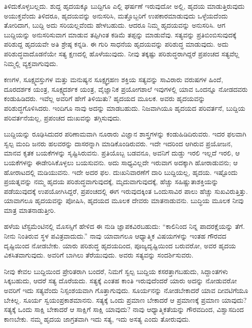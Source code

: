 ತಿಳಿದುಕೊಳ್ಳಬಲ್ಲದು. ಶುದ್ದ ಹೃದಯಕ್ಕೂ ಬುದ್ದಿಗೂ ಎಲ್ಲಿ ಘರ್ಷಣೆ ಇರುವುದೋ ಅಲ್ಲಿ, ಹೃದಯ ಮಾಡುತ್ತಿರುವುದು ಅಯುಕ್ತವೆಂದು ತಿಳಿದರೂ, ಹೃದಯವನ್ನು ಅನುಸರಿಸಿ, ಮತ್ತೊಬ್ಬರಿಗೆ ಉಪಕಾರಮಾಡುವುದು ಒಳ್ಳೆಯದೆಂದು ತೋರಿದಾಗ, ಬುದ್ದಿ ಅದು ಸರಿಯಲ್ಲವೆಂದು ಹೇಳಬಹುದು. ಆದರೂ ನಿಮ್ಮ ಹೃದಯವನ್ನು ಅನುಸರಿಸಿ. ಆಗ ಬುದ್ದಿಯನ್ನು ಅನುಸರಿಸುವಾಗ ಮಾಡುವ ತಪ್ಪಿಗಿಂತ ಕಡಿಮೆ ತಪ್ಪನ್ನು ಮಾಡುವೆವು. ಸತ್ಯವನ್ನು ಪ್ರತಿಬಿಂಬಿಸುವುದಕ್ಕೆ ಪರಿಶುದ್ದ ಹೃದಯವೇ ಅತಿ ಶ್ರೇಷ್ಠ ಕನ್ನಡಿ. ಈ ಗುರಿ ಸಾಧನೆಯ ಹೃದಯವನ್ನು ಪರಿಶುದ್ಧ ಮಾಡುವುದು. ಅದು ಪರಿಶುದ್ಧವಾದೊಡನೆಯೇ ಸತ್ಯ ಕ್ಷಣದಲ್ಲಿ ಹೊಳೆಯುವುದು. ನೀವು ತಕ್ಕಷ್ಟು ಪರಿಶುದ್ಧರಾಗಿದ್ದರೆ ಪ್ರಪಂಚದ ಸತ್ಯವೆಲ್ಲ ನಿಮ್ಮಲ್ಲಿ ವ್ಯಕ್ತವಾಗುವುದು.

ಕಣಗಳ, ಸೂಕ್ಷ್ಮವಸ್ತುಗಳ ಮತ್ತು ಮನುಷ್ಯನ ಸೂಕ್ಷ್ಮಗ್ರಹಣ ಶಕ್ತಿಯ ಸತ್ಯವನ್ನು ಸಾವಿರಾರು ವರುಷಗಳ ಹಿಂದೆ, ದೂರದರ್ಶಕ ಯಂತ್ರ, ಸೂಕ್ಷ್ಮದರ್ಶಕ ಯಂತ್ರ, ವೈಜ್ಞಾನಿಕ ಪ್ರಯೋಗಶಾಲೆ ಇವುಗಳಲ್ಲಿ ಯಾವ ಒಂದನ್ನೂ ನೋಡದವರು ಕಂಡುಹಿಡಿದರು. ಇವೆಲ್ಲ ಅವರಿಗೆ ಹೇಗೆ ತಿಳಿಯಿತು? ಹೃದಯದ ಮೂಲಕ. ಅವರು ಹೃದಯವನ್ನು ಪರಿಶುದ್ಧಗೊಳಿಸಿದರು. ಇಂದಿಗೂ ನಾವು ಅದನ್ನು ಮಾಡಬಹುದು. ನಿಜವಾಗಿಯೂ ಹೃದಯದ ಪರಿವರ್ತನೆ, ಬುದ್ದಿಯ ಪರಿವರ್ತನೆಯಲ್ಲ, ಪ್ರಪಂಚದ ದುಃಖವನ್ನು ತಗ್ಗಿಸುವುದು.

ಬುದ್ದಿಯನ್ನು ರೂಢಿಸಿದುದರ ಪರಿಣಾಮವಾಗಿ ನೂರಾರು ವಿಜ್ಞಾನ ಶಾಸ್ತ್ರಗಳನ್ನು ಕಂಡುಹಿಡಿದಿರುವರು. ಇದರ ಫಲವಾಗಿ ಸ್ವಲ್ಪ ಮಂದಿ ಜನರು ಹಲವರನ್ನು ದಾಸರನ್ನಾಗಿ ಮಾಡಿಕೊಂಡಿರುವರು. ಇದೇ ಇದರಿಂದ ಆಗಿರುವ ಪ್ರಯೋಜನ, ಮಾನವ ಕೃತಕ ಬಯಕೆಗಳನ್ನು ಸೃಷ್ಟಿಸಿರುವನು. ಪ್ರತಿಯೊಬ್ಬ ಬಡವನೂ, ಅವನಿಗೆ ದುಡ್ಡು ಇರಲಿ ಇಲ್ಲದೆ ಇರಲಿ, ಆ ಬಯಕೆಗಳನ್ನು ಈಡೇರಿಸಿಕೊಳ್ಳಲು ಬಯಸುವನು. ಅದು ಸಾಧ್ಯವಿಲ್ಲದೇ ಇರುವಾಗ ಅದಕ್ಕಾಗಿ ಹೋರಾಡುವನು; ಆ ಹೋರಾಟದಲ್ಲಿ ಮಡಿಯುವನು. ಇದೇ ಅದರ ಫಲ. ದುಃಖನಿವಾರಣೆಗೆ ದಾರಿ ಬುದ್ದಿಯಲ್ಲ, ಹೃದಯ. ಇಷ್ಟೊಂದು ಪ್ರಯತ್ನವನ್ನು ನಮ್ಮ ಹೃದಯ ಪರಿಶುದ್ಧವಾಗುವುದಕ್ಕೆ, ಮೃದುವಾಗುವುದಕ್ಕೆ, ಹೆಚ್ಚು ಸಹಿಷ್ಣುತಾಶಕ್ತಿಯನ್ನು ಪಡೆಯುವುದಕ್ಕೆ ಉಪಯೋಗಿಸಿದ್ದರೆ, ಪ್ರಪಂಚದಲ್ಲಿ ಈಗ ಇರುವುದಕ್ಕಿಂತ ಒಂದುಸಾವಿರ ಪಾಲು ಹೆಚ್ಚು ಸುಖವಿರುತ್ತಿತ್ತು. ಯಾವಾಗಲೂ ಹೃದಯವನ್ನು ಪೋಷಿಸಿ, ಹೃದಯದ ಮೂಲಕ ದೇವರು ಮಾತನಾಡುವನು. ಬುದ್ಧಿಯ ಮೂಲಕ ನೀವು ಮಾತ್ರ ಮಾತನಾಡುತ್ತೀರಿ.

ಹಳೆಯ ಟೆಸ್ಟಮೆಂಟಿನಲ್ಲಿ ಮೊಸಸ್ಸಿಗೆ ಹೇಳಿದ ಈ ನುಡಿ ಜ್ಞಾಪಕವಿರಬಹುದು: “ಕಾಲಿನಿಂದ ನಿನ್ನ ಪಾದರಕ್ಷೆಯನ್ನು ತೆಗೆ. ನೀನು ನಿಂತಿರುವ ಸ್ಥಳ ಪವಿತ್ರವಾದುದು.'' ನಾವು ಯಾವಾಗಲೂ ಆಧ್ಯಾತ್ಮಿಕ ವಿಷಯಗಳನ್ನು ಇಂತಹ ಗೌರವದ ದೃಷ್ಟಿಯಿಂದ ನೋಡಬೇಕು. ಯಾರು ಪರಿಶುದ್ಧ ಹೃದಯದಿಂದ, ಪೂಜ್ಯದೃಷ್ಟಿಯಿಂದ ಬರುವರೋ, ಅವರ ಹೃದಯ ವಿಕಸಿತವಾಗುವುದು. ಅವರಿಗೆ ಬಾಗಿಲು ತೆರೆಯುವುದು. ಅವರು ಸತ್ಯವನ್ನು ಸಂದರ್ಶಿಸುವರು.

ನೀವು ಕೇವಲ ಬುದ್ದಿಯಿಂದ ಪ್ರೇರಿತರಾಗಿ ಬಂದರೆ, ನಿಮಗೆ ಸ್ವಲ್ಪ ಬುದ್ದಿಯ ಕಸರತ್ತಾಗಬಹುದು, ಸಿದ್ದಾಂತಗಳು ಸಿಕ್ಕಬಹುದು, ಆದರೆ ಸತ್ಯ ದೊರೆಯದು. ಸತ್ಯಕ್ಕೆ ಎಂತಹ ಕಾಂತಿ ಇರುವುದೆಂದರೆ ಯಾರು ಅದನ್ನು ನೋಡುವರೋ ಅವರಿಗೆ ಇದು ಸತ್ಯವೆಂದು ನಿಸ್ಸಂಶಯವಾಗಿ ಗೊತ್ತಾಗುವುದು. ಸೂರ್ಯನನ್ನು ನೋಡಬೇಕಾದರೆ ಯಾವ ದೀವಟಿಗೆಯೂ ಬೇಕಿಲ್ಲ. ಸೂರ್ಯ ಸ್ವಯಂಪ್ರಕಾಶಮಾನನು. ಸತ್ಯಕ್ಕೆ ಒಂದು ಪ್ರಮಾಣ ಬೇಕಾದರೆ ಆ ಪ್ರಮಾಣಕ್ಕೆ ಪ್ರಮಾಣ ಯಾವುದು? ಸತ್ಯಕ್ಕೆ ಒಂದು ಸಾಕ್ಷಿ ಬೇಕಾದರೆ ಆ ಸಾಕ್ಷಿಗೆ ಸಾಕ್ಷಿ ಯಾವುದು? ನಾವು ಆಧ್ಯಾತ್ಮಿಕತೆಯನ್ನು ಗೌರವದಿಂದ, ವಿಶ್ವಾಸದಿಂದ ಕಾಣಬೇಕು. ನಮ್ಮ ಹೃದಯ ಜಾಗ್ರತವಾಗಿ ಇದು ಸತ್ಯ, ಇದು ಅಸತ್ಯ ಎಂದು ತೋರುವುದು.

